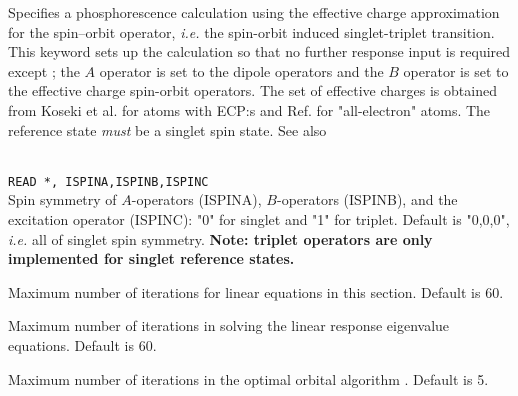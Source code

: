 \begin{description}
\item{}
Specifies a phosphorescence calculation using
the effective charge approximation for the spin--orbit operator, {\it i.e.\/}
the spin-orbit
induced singlet-triplet transition. This keyword sets up the
calculation so that no further response input is required except ; the
$A$ operator is set to the dipole operators and
the $B$ operator
is set to the effective charge spin-orbit
operators. The set of effective charges is obtained from Koseki et al.
\cite{skmsgmwsnm99,skmwsmsgjpca102} for atoms with ECP:s and Ref.\cite{skmwsmsgjpc96} for "all-electron" atoms.
The reference state {\em must} be a singlet spin state. See  also 


\item{}\\
\verb|READ *, ISPINA,ISPINB,ISPINC|\\
Spin symmetry of $A$-operators (ISPINA), $B$-operators (ISPINB),
and the excitation operator (ISPINC): "0" for singlet and "1" for triplet.
Default is "0,0,0", {\it i.e.\/} all of singlet spin symmetry.
{\bf Note: triplet operators are only implemented for singlet reference states.}

\item{}
Maximum number of iterations for linear equations in this section.
Default is 60.

\item{}
Maximum number of iterations in solving the linear
response eigenvalue
equations.
Default is 60.

\item{}
Maximum number of iterations in the optimal
orbital algorithm
\cite{tuhjahjajpjjcp84}.
Default is 5.


\end{description}
